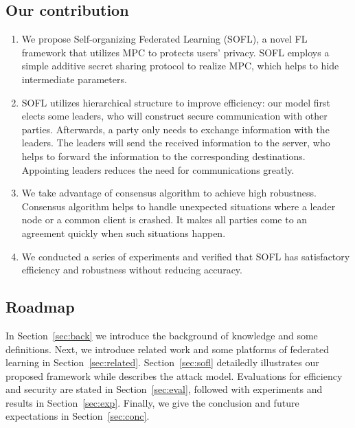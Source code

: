 \subsection{Our contribution}
\begin{enumerate}
    \item We propose Self-organizing Federated Learning (SOFL), a novel FL framework that utilizes MPC to protects users' privacy. SOFL employs a simple additive secret sharing protocol to realize MPC, which helps to hide intermediate parameters.

    \item SOFL utilizes hierarchical structure to improve efficiency: our model first elects some leaders, who will construct secure communication with other parties. Afterwards, a party only needs to exchange information with the leaders. The leaders will send the received information to the server, who helps to forward the information to the corresponding destinations. Appointing leaders reduces the need for communications greatly.

    \item We take advantage of consensus algorithm to achieve high robustness. Consensus algorithm helps to handle unexpected situations where a leader node or a common client is crashed. It makes all parties come to an agreement quickly when such situations happen.

    \item We conducted a series of experiments and verified that SOFL has satisfactory efficiency and robustness without reducing accuracy.

\end{enumerate}

\subsection{Roadmap} In Section~\ref{sec:back} we introduce the background of knowledge and some definitions. Next, we introduce related work and some platforms of federated learning in Section~\ref{sec:related}. Section~\ref{sec:sofl} detailedly illustrates our proposed framework while describes the attack model. Evaluations for efficiency and security are stated in Section~\ref{sec:eval}, followed with experiments and results in Section~\ref{sec:exp}. Finally, we give the conclusion and future expectations in Section~\ref{sec:conc}.